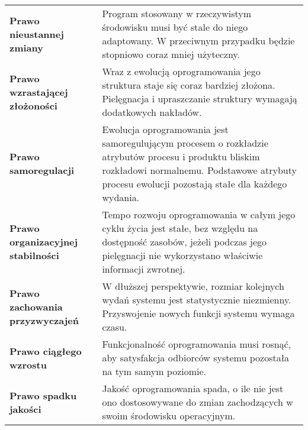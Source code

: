 \documentclass[../main.tex]{subfiles}
\begin{document}
    \begin{table}[H]
        \begin{center}
            \begin{tabular}{p{.4\linewidth} p{.6\linewidth}}
                \textbf{Prawo nieustannej zmiany}
                &
                Program stosowany w
                rzeczywistym środowisku musi być stale do niego
                adaptowany. W przeciwnym przypadku będzie
                stopniowo coraz mniej użyteczny.
                \\

                \textbf{Prawo wzrastającej złożoności}
                &
                Wraz z ewolucją
                oprogramowania jego struktura staje się coraz
                bardziej złożona. Pielęgnacja i upraszczanie struktury
                wymagają dodatkowych nakładów.
                \\

                \textbf{Prawo samoregulacji}
                &
                Ewolucja oprogramowania jest
                samoregulującym procesem o rozkładzie atrybutów
                procesu i produktu bliskim rozkładowi normalnemu.
                Podstawowe atrybuty procesu ewolucji pozostają stałe
                dla każdego wydania.
                \\

                \textbf{Prawo organizacyjnej stabilności}
                &
                Tempo rozwoju
                oprogramowania w całym jego cyklu życia jest stałe,
                bez względu na dostępność zasobów, jeżeli podczas
                jego pielęgnacji nie wykorzystano właściwie informacji
                zwrotnej.
                \\


                \textbf{Prawo zachowania przyzwyczajeń}
                &
                W dłuższej
                perspektywie, rozmiar kolejnych wydań systemu
                jest statystycznie niezmienny. Przyswojenie nowych
                funkcji systemu wymaga czasu.
                \\

                \textbf{Prawo ciągłego wzrostu}
                &
                Funkcjonalność
                oprogramowania musi rosnąć, aby satysfakcja
                odbiorców systemu pozostała na tym samym
                poziomie.
                \\

                \textbf{Prawo spadku jakości}
                &
                Jakość oprogramowania spada,
                o ile nie jest ono dostosowywane do zmian
                zachodzących w swoim środowisku operacyjnym.
                \\


\end{tabular}
\end{center}
\end{table}
\end{document}
